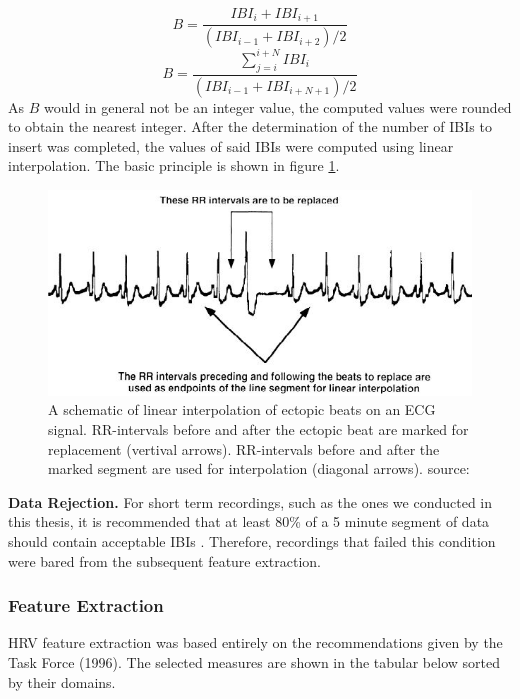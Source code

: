 \begin{equation}\label{Bsingle}
B = \frac{IBI_{i}+IBI_{i+1}}{(IBI_{i-1}+IBI_{i+2})/2}
\end{equation}
\begin{equation}\label{Bseq}
B = \frac{\sum_{j=i}^{i+N} IBI_{i}}{(IBI_{i-1}+IBI_{i+N+1})/2}
\end{equation}
As $B$ would in general not be an integer value, the computed values were rounded to obtain the nearest integer. After the determination of the number of IBIs to insert was completed, the values of said IBIs were computed using linear interpolation. The basic principle is shown in figure \ref{ebrep}.

\begin{figure}[h!]
	\centering
  \includegraphics[width=1.0\textwidth, angle=0]{images/eb_replacement.jpg}
	\caption[Linear Interpolation of Ectopic Beats]{A schematic of linear interpolation of ectopic beats on an ECG signal. RR-intervals before and after the ectopic beat are marked for replacement (vertival arrows). RR-intervals before and after the marked segment are used for interpolation (diagonal arrows). source: \cite{Lippman1994}}
	\label{ebrep}
\end{figure}
\textbf{Data Rejection.} For short term recordings, such as the ones we conducted in this thesis, it is recommended that at least 80\% of a 5 minute segment of data should contain acceptable IBIs \cite{Clifford2002}. Therefore, recordings that failed this condition were bared from the subsequent feature extraction.


\newpage
\subsubsection{Feature Extraction}
HRV feature extraction was based entirely on the recommendations given by the Task Force (1996). The selected measures are shown in the tabular below sorted by their domains.

